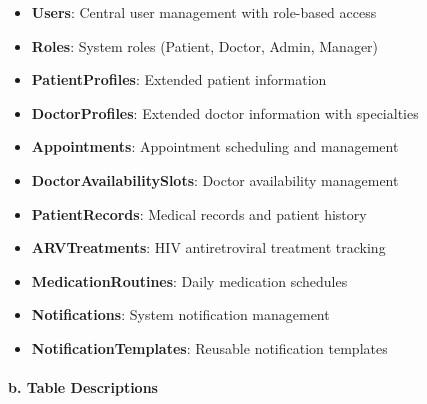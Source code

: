 \documentclass[12pt,a4paper]{article}
\begin{document}
\begin{itemize}
    \item \textbf{Users}: Central user management with role-based access
    \item \textbf{Roles}: System roles (Patient, Doctor, Admin, Manager)
    \item \textbf{PatientProfiles}: Extended patient information
    \item \textbf{DoctorProfiles}: Extended doctor information with specialties
    \item \textbf{Appointments}: Appointment scheduling and management
    \item \textbf{DoctorAvailabilitySlots}: Doctor availability management
    \item \textbf{PatientRecords}: Medical records and patient history
    \item \textbf{ARVTreatments}: HIV antiretroviral treatment tracking
    \item \textbf{MedicationRoutines}: Daily medication schedules
    \item \textbf{Notifications}: System notification management
    \item \textbf{NotificationTemplates}: Reusable notification templates
\end{itemize}

\paragraph{b. Table Descriptions}
\end{document}
